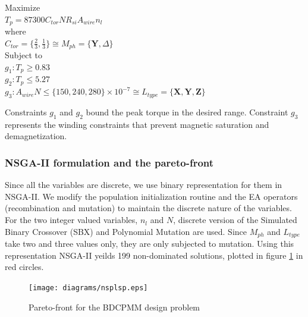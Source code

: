 \begin{singlespacing}
\begin{flushleft}

Maximize \\
$ T_p = 87300 C_{tor} N R_{si} A_{wire} n_{l} $\\
where \\
$ C_{tor} = \{ \frac{2}{3}, \frac{1}{3} \} \cong M_{ph} = \{ \textbf{Y}, \Delta  \} $ 
\\[\baselineskip]


Subject to \\
$g_1: T_{p} \geqslant 0.83$ \\

$g_2: T_{p} \leqslant 5.27$ \\

$g_3: A_{wire}N \leqslant \{150, 240, 280\} \times 10^{-7} \cong L_{type} = \{ \textbf{X}, \textbf{Y}, \textbf{Z} \}$

\end{flushleft}

\end{singlespacing}

Constraints $g_1$ and $g_2$ bound the peak torque in the desired 
range. Constraint $g_3$ represents the winding constraints that 
prevent magnetic saturation and demagnetization.

\subsubsection{NSGA-II formulation and the pareto-front}
Since all the variables are discrete, we use binary representation
for them in NSGA-II. We modify the population initialization routine
and the EA operators (recombination and mutation) to maintain the 
discrete nature of the variables. For the two integer valued 
variables, $n_l$ and $N$, discrete version of the Simulated Binary 
Crossover (SBX) and Polynomial Mutation \cite{deb2001} are used. Since
$M_{ph}$ and $L_{type}$ take two and three values only, they are only
subjected to mutation. Using this representation NSGA-II yeilds 199 
non-dominated solutions, plotted in figure \ref{nsplsp} in red circles.


\begin{figure}[ht]\begin{center}
 \texttt{[image: diagrams/nsplsp.eps]} 
 \caption{Pareto-front for the BDCPMM design problem}
 \label{nsplsp}
\end{center}\end{figure}



